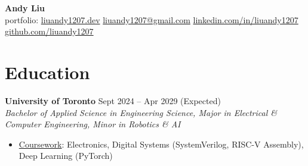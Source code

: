 \documentclass[10pt,letterpaper]{article}
\begin{document}
\begin{center}
\huge{\textbf{Andy Liu}} \\
\vspace{0.25em}
\small{{portfolio: 
    \href{https://liuandy1207.dev}{liuandy1207.dev}}
    \hspace{0.5em} \textbar\hspace{0.5em}
    \href{mailto: liuandy1207@gmail.com}{liuandy1207@gmail.com}
    \hspace{0.5em} \textbar\hspace{0.5em}
    \href{https://www.linkedin.com/in/liuandy1207/}{linkedin.com/in/liuandy1207}}
    \hspace{0.5em} \textbar\hspace{0.5em}
    \href{https://github.com/liuandy1207}{github.com/liuandy1207}
\end{center} \vspace{-0.7em}







\section{Education}

\textbf{University of Toronto} \hfill
Sept 2024 -- Apr 2029 (Expected) \\
\textit{Bachelor of Applied Science in Engineering Science, Major in Electrical \& Computer Engineering, Minor in Robotics \& AI} \hfill 
\begin{itemize}
    \item \underline{Coursework}: 
    Electronics, 
    Digital Systems (SystemVerilog, RISC-V Assembly), Deep Learning (PyTorch)
\end{itemize} \vspace{0.25em}
\end{document}
